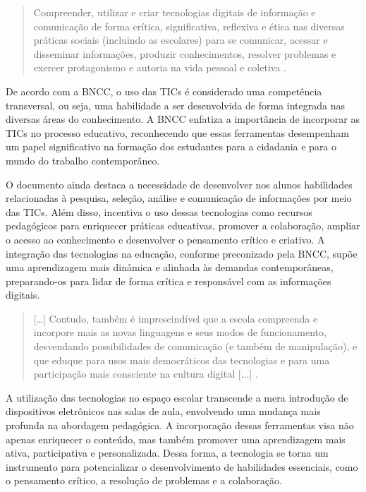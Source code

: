 \documentclass[portuguese]{textolivre}
\begin{document}
\begin{quote}
    Compreender, utilizar e criar tecnologias digitais de informação e comunicação de forma crítica, significativa, reflexiva e ética nas diversas práticas sociais (incluindo as escolares) para se comunicar, acessar e disseminar informações, produzir conhecimentos, resolver problemas e exercer protagonismo e autoria na vida pessoal e coletiva \cite[p. 11]{brasil_base_2018}.
\end{quote}

De acordo com a BNCC, o uso das TICs é considerado uma competência transversal, ou seja, uma habilidade a ser desenvolvida de forma integrada nas diversas áreas do conhecimento. A BNCC enfatiza a importância de incorporar as TICs no processo educativo, reconhecendo que essas ferramentas desempenham um papel significativo na formação dos estudantes para a cidadania e para o mundo do trabalho contemporâneo.

O documento ainda destaca a necessidade de desenvolver nos alunos habilidades relacionadas à pesquisa, seleção, análise e comunicação de informações por meio das TICs. Além disso, incentiva o uso dessas tecnologias como recursos pedagógicos para enriquecer práticas educativas, promover a colaboração, ampliar o acesso ao conhecimento e desenvolver o pensamento crítico e criativo. A integração das tecnologias na educação, conforme preconizado pela BNCC, supõe uma aprendizagem mais dinâmica e alinhada às demandas contemporâneas, preparando-os para lidar de forma crítica e responsável com as informações digitais.

\begin{quote}
    […] Contudo, também é imprescindível que a escola compreenda e incorpore mais as novas linguagens e seus modos de funcionamento, desvendando possibilidades de comunicação (e também de manipulação), e que eduque para usos mais democráticos das tecnologias e para uma participação mais consciente na cultura digital [...] \cite[p. 61]{brasil_base_2018}.
\end{quote}

A utilização das tecnologias no espaço escolar transcende a mera introdução de dispositivos eletrônicos nas salas de aula, envolvendo uma mudança mais profunda na abordagem pedagógica. A incorporação dessas ferramentas visa não apenas enriquecer o conteúdo, mas também promover uma aprendizagem mais ativa, participativa e personalizada. Dessa forma, a tecnologia se torna um instrumento para potencializar o desenvolvimento de habilidades essenciais, como o pensamento crítico, a resolução de problemas e a colaboração.
\end{document}
